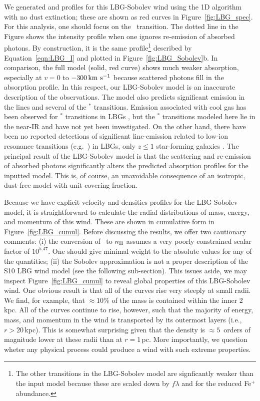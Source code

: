 \documentclass[12pt,preprint]{aastex}
\begin{document}
We generated  and  profiles for this LBG-Sobolev
wind
using the 1D algorithm with no dust extinction; these are shown as
red curves in Figure~\ref{fig:LBG_spec}.   For this analysis, one
should focus on the \mgiia\ transition.  The dotted line in the Figure
shows the intensity profile when one ignores re-emission
of absorbed photons.  By construction, it is the same profile\footnote{
  The other transitions in
  the LBG-Sobolev model are signficantly weaker than the input model
  because these are scaled down by $f\lambda$ and 
  for  the reduced Fe$^+$ abundance.} 
described by Equation~\ref{eqn:LBG_I} and plotted in
Figure~\ref{fig:LBG_Sobolev}b.   In comparison, the full model (solid,
red curve)
shows much weaker absorption, especially at $v = 0$ to $-300 \, {\rm km~s^{-1}}$
because scattered photons fill in the absorption profile.
In this respect, our LBG-Sobolev model is an
inaccurate description of the observations. The model
also predicts significant emission in the  lines and several of
the $^*$ transitions.   Emission associated with cool gas
has been observed for $^*$
transitions in LBGs \citep{prs+02,shapley03}, but
the $^*$ transitions
modeled here lie in the near-IR and have not yet been investigated.
On the other hand, there have been no 
reported detections of significant line-emission related to low-ion resonance
transitions (e.g.\ ) in LBGs, only $z \le 1$ star-forming galaxies
\citep{wcp+09,rwk+10}.  
The principal result of the LBG-Sobolev model is that the scattering and re-emission of
absorbed photons significantly alters the predicted absorption profiles
for the inputted model.  This is, of course, an unavoidable
consequence of an isotropic, dust-free model with unit covering
fraction.

Because we have explicit velocity and densities profiles for the LBG-Sobolev
model, it is straightforward to calculate the radial
distributions of mass, energy, and momentum of
this wind.  These are shown in cumulative form in
Figure~\ref{fig:LBG_cumul}.  Before discussing the results, we offer
two cautionary comments: (i) the conversion of \nmg\ to $n_{\rm H}$
assumes a very poorly constrained scalar factor of $10^{5.47}$.  One
should give minimal weight to the absolute values for any of the
quantities;
(ii) the Sobolev approximation is not a proper description of the S10
LBG wind model (see the following sub-section).
This issues aside, we may inspect Figure~\ref{fig:LBG_cumul} to reveal
global properties of this LBG-Sobolev wind.
One obvious result is that all of the curves rise very steeply at
small radii.  We find, for example, that $\approx 10\%$ of the mass is
contained within the inner 2\,kpc.  All of the curves continue to
rise, however, such that the majority of energy, mass, and momentum in
the wind is transported by its outermost layers (i.e., $r > 20$\,kpc).
This is somewhat surprising given that the density is $\approx
5$~orders of magnitude lower at these radii than at $r = 1$\,pc.
More importantly, we question wheter any physical process could
produce a wind with such extreme properties. 
\end{document}

